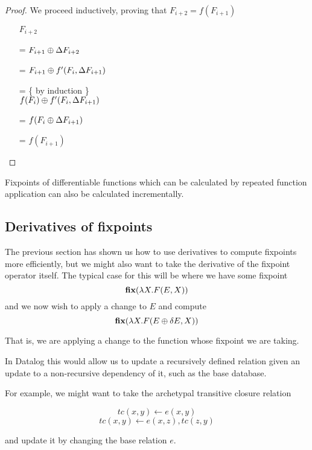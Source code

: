 \ifproofs
\begin{proof}
We proceed inductively, proving that $F_{i+2} = f(F_{i+1})$

\begin{itemize}
\item[ ]$F_{i+2}$
\item[=]
$
F_{i+1} \oplus \Delta F_{i+2}
$
\item[=]
$
F_{i+1} \oplus f'( F_i, \Delta F_{i+1})
$
\item[=] \{ by induction \}\\
$
f(F_i) \oplus f'(F_i, \Delta F_{i+1})
$
\item[=]
$
f(F_i \oplus \Delta F_{i+1})
$ 
\item[=]
$f(F_{i+1})$
\end{itemize}
\end{proof}
\fi

\begin{corollary}
\label{corollary:diffFP}
  Fixpoints of differentiable functions which can be calculated by repeated
  function application can also be calculated incrementally.
\end{corollary}

\subsection{Derivatives of fixpoints}
\label{sec:fixpointDerivatives}

The previous section has shown us how to use derivatives to compute fixpoints
more efficiently, but we might also want to take the derivative of the fixpoint
operator itself. The typical case for this will be where we have some fixpoint
$$\textbf{fix} (\lambda X . F(E, X))$$
and we now wish to apply a change to $E$ and compute
$$\textbf{fix} (\lambda X . F(E \oplus \delta E, X))$$

That is, we are applying a change to the function whose fixpoint we are taking.

In Datalog this would allow us to update a recursively defined relation given an
update to a non-recursive dependency of it, such as the base database.

For example, we might want to take the archetypal transitive closure relation

$$tc(x, y) \leftarrow e(x, y)$$
$$tc(x, y) \leftarrow e(x, z), tc(z, y)$$

and update it by changing the base relation $e$.

